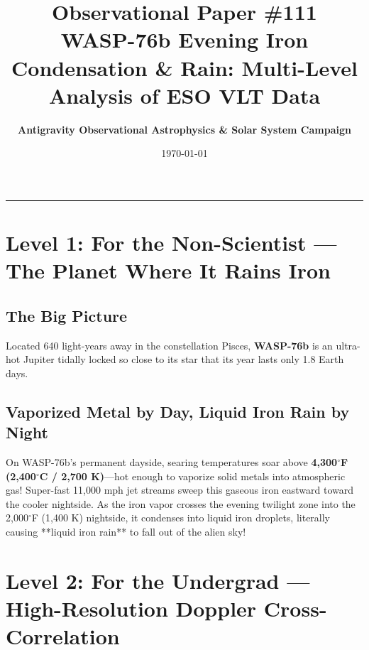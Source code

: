 \documentclass[11pt,a4paper]{article}
\title{\Huge \textbf{Observational Paper \#111}\\ \Large WASP-76b Evening Iron Condensation \& Rain: Multi-Level Analysis of ESO VLT Data}
\author{\textbf{Antigravity Observational Astrophysics \& Solar System Campaign}}
\date{\today}
\begin{document}
\maketitle

\vspace{-1em}
\begin{center}
\rule{\textwidth}{1.5pt}
\end{center}

\section*{Level 1: For the Non-Scientist — The Planet Where It Rains Iron}

\subsection*{The Big Picture}
Located 640 light-years away in the constellation Pisces, \textbf{WASP-76b} is an ultra-hot Jupiter tidally locked so close to its star that its year lasts only 1.8 Earth days.

\subsection*{Vaporized Metal by Day, Liquid Iron Rain by Night}
On WASP-76b's permanent dayside, searing temperatures soar above \textbf{4,300$^\circ$F (2,400$^\circ$C / 2,700 K)}—hot enough to vaporize solid metals into atmospheric gas! Super-fast 11,000 mph jet streams sweep this gaseous iron eastward toward the cooler nightside. As the iron vapor crosses the evening twilight zone into the 2,000$^\circ$F (1,400 K) nightside, it condenses into liquid iron droplets, literally causing **liquid iron rain** to fall out of the alien sky!

\newpage

\section*{Level 2: For the Undergrad — High-Resolution Doppler Cross-Correlation}
\end{document}
